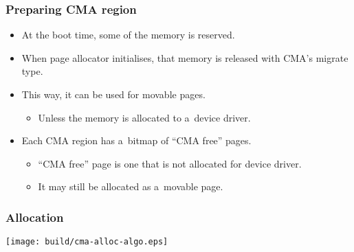 \begin{frame}
  \frametitle{Preparing CMA region}

  \begin{itemize}
  \item At the boot time, some of the memory is reserved.
  \item When page allocator initialises, that memory is released with
    CMA's migrate type.
  \item This way, it can be used for movable pages.
    \begin{itemize}
    \item Unless the memory is allocated to a~device driver.
    \end{itemize}
  \item Each CMA region has a~bitmap of “CMA free” pages.
    \begin{itemize}
    \item “CMA free” page is one that is not allocated for device
      driver.
    \item It may still be allocated as a~movable page.
    \end{itemize}
  \end{itemize}
\end{frame}

\begin{frame}[fragile]
  \frametitle{Allocation}

  \begin{center}
    \texttt{[image: build/cma-alloc-algo.eps]}
  \end{center}

\end{frame}

